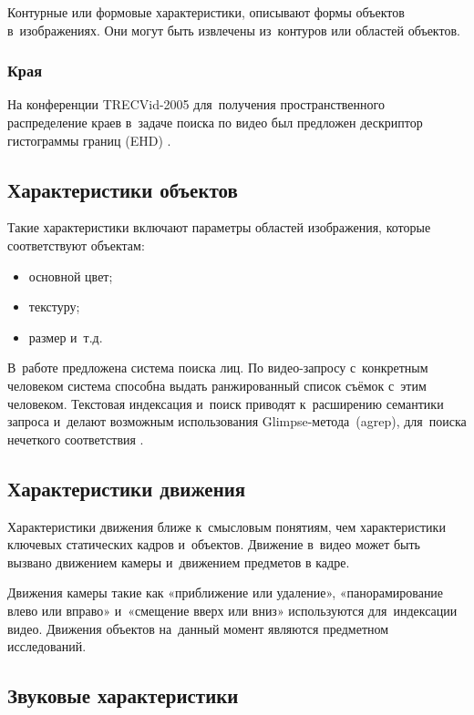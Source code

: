 Контурные или формовые характеристики, описывают формы объектов в~изображениях.
Они могут быть извлечены из~контуров или областей объектов.


\subsubsection{Края}

На конференции TRECVid-2005 для~получения
пространственного распределение краев в~задаче поиска по видео был предложен
дескриптор гистограммы границ (EHD) \cite{Hauptmann:2003}.

\subsection{Характеристики объектов}

Такие характеристики включают параметры областей изображения,
которые соответствуют объектам:
\begin{itemize}
    \item основной цвет;
    \item текстуру;
    \item размер и~т.д.
\end{itemize}

В~работе \cite{Sivic:2005} предложена система поиска лиц.
По видео-запросу с~конкретным человеком
система способна выдать ранжированный список съёмок с~этим человеком.
Текстовая индексация и~поиск приводят к~расширению семантики запроса
и~делают возможным использования Glimpse-метода\ (agrep),
для~поиска нечеткого соответствия \cite{Li:2002}.


\subsection{Характеристики движения}

Характеристики движения ближе к~смысловым понятиям,
чем характеристики ключевых статических кадров и~объектов.
Движение в~видео может быть вызвано движением камеры
и~движением предметов в кадре.

Движения камеры такие как «приближение или удаление»,
«панорамирование влево или вправо» и~«смещение вверх или вниз»
используются для~индексации видео.
Движения объектов на~данный момент являются предметном исследований.

\subsection{Звуковые характеристики}


